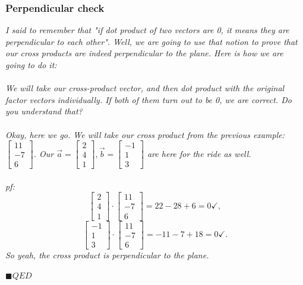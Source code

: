 \documentclass[addpoints]{exam}
\begin{document}
\subsubsection{
Perpendicular check
}
\textit{
I said to remember that "if dot product of two vectors are 0, it means they are perpendicular to each other". Well, we are going to use that notion to prove that our cross products are indeed perpendicular to the plane. Here is how we are going to do it:\\\\
We will take our cross-product vector, and then dot product with the original factor vectors individually. If both of them turn out to be 0, we are correct. Do you understand that?\\\\
Okay, here we go. We will take our cross product from the previous example: $\begin{bmatrix}
    11\\-7\\6
\end{bmatrix}$. Our $\vec{a}=
\begin{bmatrix}
    2\\4\\1
\end{bmatrix},
\vec{b}=
\begin{bmatrix}
    -1\\1\\3
\end{bmatrix}$ are here for the ride as well.\\\\
pf:
\[
\begin{bmatrix}
    2\\4\\1
\end{bmatrix}\cdot
\begin{bmatrix}
    11\\-7\\6
\end{bmatrix}=
22-28+6 = 0\checkmark,
\]
\[
\begin{bmatrix}
    -1\\1\\3
\end{bmatrix}\cdot
\begin{bmatrix}
    11\\-7\\6
\end{bmatrix}=
-11-7+18= 0\checkmark.
\]
So yeah, the cross product is perpendicular to the plane. \\\\
$\blacksquare QED$
}
\end{document}
